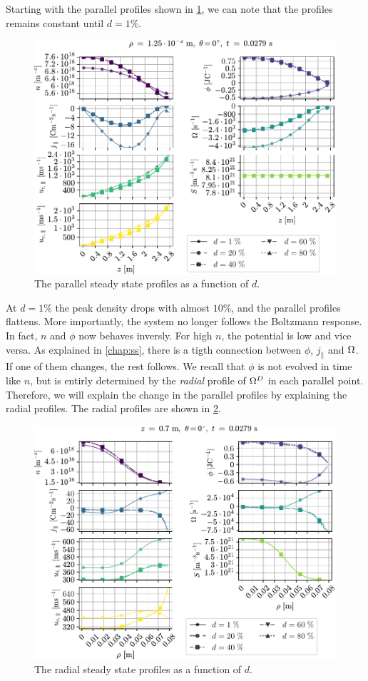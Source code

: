 Starting with the parallel profiles shown in \cref{fig:nnScanPar}, we can note that the profiles remains constant until $d=1\%$.
%
\begin{figure}[htb]
    \centering
    \includegraphics{fig/results/neutral/nnScanPar}
    \caption{The parallel steady state profiles as a function of $d$.}
    \label{fig:nnScanPar}
\end{figure}
%
At $d=1\%$ the peak density drops with almost $10\%$, and the parallel profiles flattens.
More importantly, the system no longer follows the Boltzmann response.
In fact, $n$ and $\phi$ now behaves inversly.
For high $n$, the potential is low and vice versa.
As explained in \cref{chap:ss}, there is a tigth connection between $\phi$, $j_\|$ and $\Omega$.
If one of them changes, the rest follows.
We recall that $\phi$ is not evolved in time like $n$, but is entirly determined by the \emph{radial} profile of $\Omega^D$ in each parallel point.
Therefore, we will explain the change in the parallel profiles by explaining the radial profiles.
The radial profiles are shown in \cref{fig:nnScanRad}.
%
\begin{figure}[htb]
    \centering
    \includegraphics{fig/results/neutral/nnScanRad}
    \caption{The radial steady state profiles as a function of $d$.}
    \label{fig:nnScanRad}
\end{figure}
